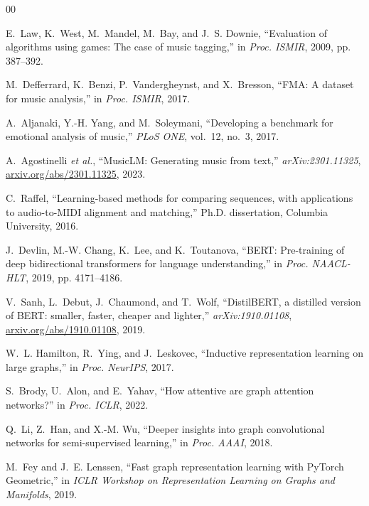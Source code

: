 \documentclass[conference]{IEEEtran}
\begin{document}
\begin{thebibliography}{00}

 E.~Law, K.~West, M.~Mandel, M.~Bay, and J.~S. Downie,
``Evaluation of algorithms using games: The case of music tagging,'' in
\emph{Proc. ISMIR}, 2009, pp. 387--392.

 M.~Defferrard, K.~Benzi, P.~Vandergheynst, and
X.~Bresson, ``FMA: A dataset for music analysis,'' in \emph{Proc. ISMIR}, 2017.

 A.~Aljanaki, Y.-H. Yang, and M.~Soleymani,
``Developing a benchmark for emotional analysis of music,'' \emph{PLoS ONE},
vol.~12, no.~3, 2017.

 A.~Agostinelli \emph{et al.}, ``MusicLM:
Generating music from text,'' \emph{arXiv:2301.11325}, \href{https://arxiv.org/abs/2301.11325}{arxiv.org/abs/2301.11325}, 2023.

 C.~Raffel, ``Learning-based methods for comparing
sequences, with applications to audio-to-MIDI alignment and matching,'' Ph.D.
dissertation, Columbia University, 2016.

 J.~Devlin, M.-W. Chang, K.~Lee, and K.~Toutanova,
``BERT: Pre-training of deep bidirectional transformers for language
understanding,'' in \emph{Proc. NAACL-HLT}, 2019, pp. 4171--4186.

 V.~Sanh, L.~Debut, J.~Chaumond, and T.~Wolf,
``DistilBERT, a distilled version of BERT: smaller, faster, cheaper and
lighter,'' \emph{arXiv:1910.01108}, \href{https://arxiv.org/abs/1910.01108}{arxiv.org/abs/1910.01108}, 2019.

 W.~L. Hamilton, R.~Ying, and J.~Leskovec,
``Inductive representation learning on large graphs,'' in \emph{Proc. NeurIPS},
2017.

 S.~Brody, U.~Alon, and E.~Yahav, ``How attentive are
graph attention networks?'' in \emph{Proc. ICLR}, 2022.

 Q.~Li, Z.~Han, and X.-M. Wu, ``Deeper insights into
graph convolutional networks for semi-supervised learning,'' in \emph{Proc.
AAAI}, 2018.

 M.~Fey and J.~E. Lenssen, ``Fast graph representation
learning with PyTorch Geometric,'' in \emph{ICLR Workshop on Representation
Learning on Graphs and Manifolds}, 2019.


\end{thebibliography}
\end{document}
